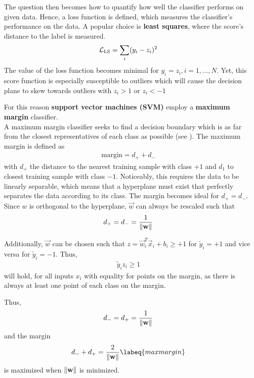 The question then becomes how to quantify how well the classifier performs on given data.
Hence, a loss function is defined, which measures the classifier's performance on the data.
A popular choice is \textbf{least squares}, where the score's distance to the label is measured.
\begin{align}
    \mathcal{L}_{\text{LS}} = \sum_i (y_i - z_i)^2
\end{align}
The value of the loss function becomes minimal for $y_i = z_i, i = 1,...,N$.
Yet, this score function is especially susceptible to outliers which will cause the decision plane to skew towards outliers with $z_i > 1$ or $z_i < -1$

For this reason \textbf{support vector machines (SVM)} employ a \textbf{maximum margin} classifier.\\
A maximum margin classifier seeks to find a decision boundary which is as far from the closest representatives of each class as possible (see ).
The maximum margin is defined as
\begin{align}
    \text{margin} = d_+ + d_-
\end{align}
with $d_+$ the distance to the nearest training sample with class $+1$ and $d_1$ to closest training sample with class $-1$.
Noticeably, this requires the data to be linearly separable, which means that a hyperplane must exist that perfectly separates the data according to its class.
The margin becomes ideal for $d_+ = d_-$.
Since $w$ is orthogonal to the hyperplane, $\vec{w}$ can always be rescaled such that 
\begin{align}
    d_+ = d_- = \frac{1}{\left\lVert\mathbf{w}\right\rVert}
\end{align}

Additionally, $\vec{w}$ can be chosen such that $z = \vec{w}_i^T \vec{x}_i + b_i \geq +1$ for $\tilde{y}_i = +1$ and vice versa for $\tilde{y}_i = -1$.
Thus,
\begin{align}
    \tilde{y}_i z_i \geq 1
\end{align}
will hold, for all inputs $x_i$ with equality for points on the margin, as there is always at least one point of each class on the margin.

Thus,
\begin{align}
    d_- = d_+ = \frac{1}{\left\lVert\mathbf{w}\right\rVert}
\end{align}
and the margin
\begin{align}
    d_- + d_+ = \frac{2}{\norm{\vec{w}}}
    \labeq{maxmargin}
\end{align}
is maximized when $\left\lVert\mathbf{w}\right\rVert$ is minimized.


